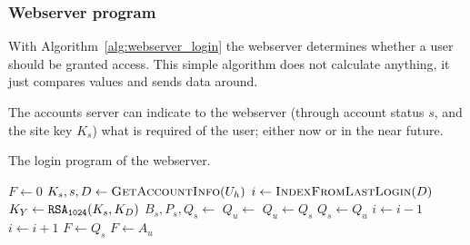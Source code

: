 \subsubsection{Webserver program}
With Algorithm~\vref{alg:webserver_login} the webserver determines whether a user should be granted access.
This simple algorithm does not calculate anything,
it just compares values and sends data around.
\par
The accounts server can indicate to the webserver
(through account status $s$,
and the site key $K_s$)
what is required of the user;
either now or in the near future.
\begin{algorithm}
\caption{The login program of the webserver.}
\label{alg:webserver_login}
\begin{algorithmic}[1]
\State $F\gets 0$ 
\State $K_s,s,D\gets\Call{GetAccountInfo}{U_h}$ 
\State $i\gets\Call{IndexFromLastLogin}{D}$	
\Repeat
\State $K_Y\gets\texttt{\ensuremath{\mathtt{RSA_{1024}}}}(K_s,K_D)$	
\State $B_s,P_s,Q_s\gets$ 
\State $Q_u\gets$
\Else{}
\State $Q_u\gets Q_s$
\EndIf
{}
\State $Q_s\gets Q_u$
\EndIf
{} 
\State $i\gets i-1$ 
\Else {}
\State $i\gets i+1$ 
\EndIf
{}
\State $F\gets Q_s$ 
 
\State $F\gets A_u$ 
\EndIf
\EndIf
\State {} 
\EndProcedure
\end{algorithmic}
\end{algorithm}
